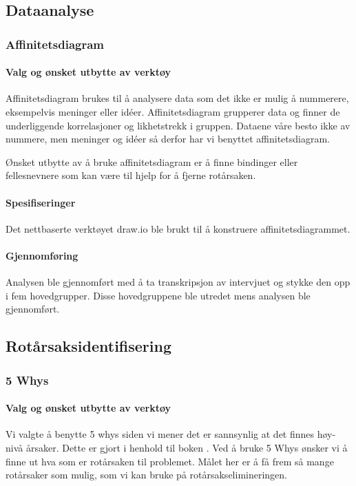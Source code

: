 \subsection{Dataanalyse}
\subsubsection{Affinitetsdiagram}

\paragraph{Valg og ønsket utbytte av verktøy}
Affinitetsdiagram brukes til å analysere data som det ikke er mulig å nummerere, eksempelvis meninger eller idéer. Affinitetsdiagram grupperer data og finner de underliggende korrelasjoner og likhetstrekk i gruppen. Dataene våre besto ikke av nummere, men meninger og idéer så derfor har vi benyttet affinitetsdiagram. 

Ønsket utbytte av å bruke affinitetsdiagram er å finne bindinger eller fellesnevnere som kan være til hjelp for å fjerne rotårsaken.

\paragraph{Spesifiseringer}
Det nettbaserte verktøyet draw.io ble brukt til å konstruere affinitetsdiagrammet.

\paragraph{Gjennomføring}
Analysen ble gjennomført med å ta transkripsjon av intervjuet og stykke den opp i fem hovedgrupper. Disse hovedgruppene ble utredet mens analysen ble gjennomført.

\subsection{Rotårsaksidentifisering}
\subsubsection{5 Whys}

\paragraph{Valg og ønsket utbytte av verktøy}
Vi valgte å benytte 5 whys siden vi mener det er sannsynlig at det finnes høy-nivå årsaker. Dette er gjort i henhold til boken \cite{RCA}.
Ved å bruke 5 Whys ønsker  vi å finne ut hva som er rotårsaken til problemet. Målet her er å få frem så mange rotårsaker som mulig, som vi kan bruke på rotårsakselimineringen. 

